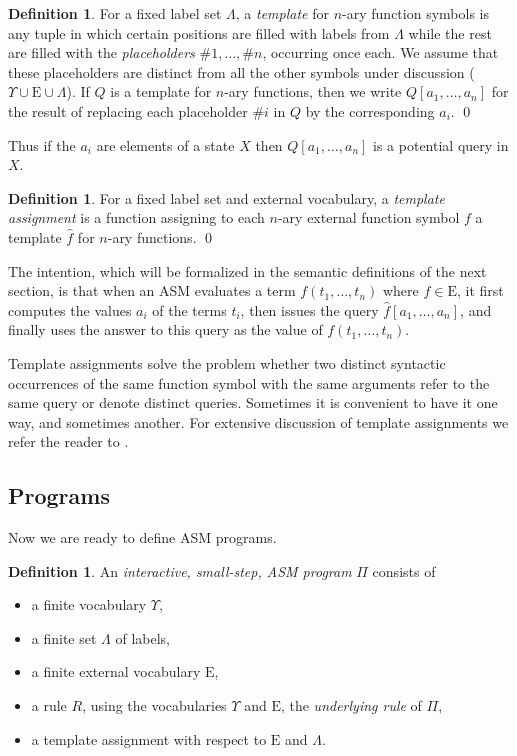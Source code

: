 \documentclass{LMCS}
\theoremstyle{definition}
\newtheorem{df}[thm]{Definition}
\newenvironment{ls}{\begin{itemize}}{\end{itemize}}
\newcommand{\E}{\mathrm{E}}
\newcommand{\U}{\Upsilon}
\begin{document}
\begin{df}
For a fixed label set $\Lambda$, a \emph{template} for $n$-ary
  function symbols is any tuple in which certain positions are filled
  with labels from $\Lambda$ while the rest are filled with the
  \emph{placeholders} $\#1,\dots,\#n$, occurring once
  each.  We assume that these placeholders are distinct from all
  the other symbols under discussion ($\U\cup \E \cup\Lambda$).
  If $Q$ is a template for $n$-ary functions, then we write
  $Q[a_1,\dots,a_n]$ for the result of replacing each placeholder
  $\#i$ in $Q$ by the corresponding $a_i$.
  \qed\end{df}

Thus if the $a_i$ are elements of a state $X$ then
$Q[a_1,\dots,a_n]$ is a potential query in $X$.

\begin{df}
For a fixed label set and external vocabulary, a \emph{template
assignment} is a function assigning to each $n$-ary external
function symbol $f$ a template $\hat f$ for $n$-ary functions.
\qed\end{df}

The intention, which will be formalized in the semantic definitions
of the next section, is that when an ASM evaluates a term
$f(t_1,\dots,t_n)$ where $f\in \E$, it first computes the
values $a_i$ of the terms $t_i$, then issues the query $\hat
f[a_1,\dots,a_n]$, and finally uses the answer to this query as the
value of $f(t_1,\dots,t_n)$.

Template assignments solve the problem whether two distinct syntactic
occurrences of the same function symbol with the same arguments refer
to the same query or denote distinct queries.  Sometimes it is
convenient to have it one way, and sometimes another.  For extensive
discussion of template assignments we refer the reader to \cite{oa2}.

\subsection{Programs} \label{sugar}

Now we are ready to define ASM programs.

\begin{df}   \label{asm-prog-def}
  An \emph{interactive, small-step, ASM program} $\Pi$ consists of
  \begin{ls}
    \item a finite vocabulary $\U$,
    \item a finite set $\Lambda$ of labels,
    \item a finite external vocabulary $\E$,
    \item a rule $R$, using the vocabularies $\U$ and
    $\E$, the \emph{underlying rule} of $\Pi$,
    \item a template assignment with respect to $\E$ and $\Lambda$.
  \end{ls}
\end{df}
\end{document}
